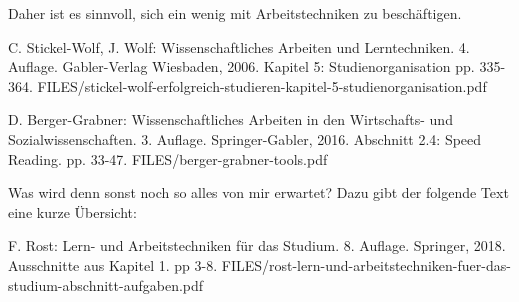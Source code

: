 Daher ist es sinnvoll, sich ein wenig mit Arbeitstechniken zu beschäftigen.

{C. Stickel-Wolf, J. Wolf: Wissenschaftliches Arbeiten und Lerntechniken.
4. Auflage. Gabler-Verlag Wiesbaden, 2006.
Kapitel 5: Studienorganisation
pp. 335-364.}
{FILES/stickel-wolf-erfolgreich-studieren-kapitel-5-studienorganisation.pdf}
{}

{D. Berger-Grabner: Wissenschaftliches Arbeiten in den Wirtschafts- und Sozialwissenschaften.
3. Auflage. Springer-Gabler, 2016.
Abschnitt 2.4: Speed Reading.
pp. 33-47.}
{FILES/berger-grabner-tools.pdf}
{}


Was wird denn sonst noch so alles von mir erwartet? Dazu gibt der folgende Text eine kurze Übersicht:

{F. Rost: Lern- und Arbeitstechniken für das Studium.
8. Auflage.
Springer, 2018.
Ausschnitte aus Kapitel 1.
pp 3-8.}
{FILES/rost-lern-und-arbeitstechniken-fuer-das-studium-abschnitt-aufgaben.pdf}
{}







